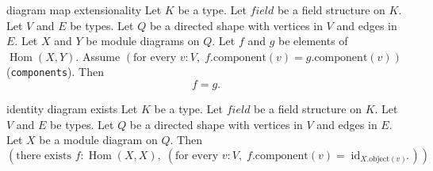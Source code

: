 \begin{cleanresult}{diagram map extensionality}
Let $K$ be a type.
Let $\mathit{field}$ be a field structure on $K$.
Let $V$ and $E$ be types.
Let $Q$ be a directed shape with vertices in $V$ and edges in $E$.
Let $X$ and $Y$ be module diagrams on $Q$.
Let $f$ and $g$ be elements of $\operatorname{Hom}(X,Y)$.
Assume $\left(\text{for every }v : V,\; f.\mathrm{component}(v) = g.\mathrm{component}(v)\right)$ (\texttt{components}).
Then \[f = g.\]
\end{cleanresult}

\begin{cleanresult}{identity diagram exists}
Let $K$ be a type.
Let $\mathit{field}$ be a field structure on $K$.
Let $V$ and $E$ be types.
Let $Q$ be a directed shape with vertices in $V$ and edges in $E$.
Let $X$ be a module diagram on $Q$.
Then \[\left(\text{there exists }f : \operatorname{Hom}(X,X),\; \left(\text{for every }v : V,\; f.\mathrm{component}(v) = \operatorname{id}_{X.\mathrm{object}(v)}\right)\right).\]
\end{cleanresult}

